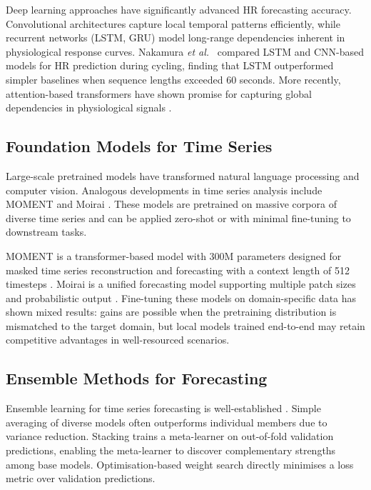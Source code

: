 \documentclass[11pt,a4paper]{article}
\newcommand{\etal}{\textit{et al.}}
\begin{document}
Deep learning approaches have significantly advanced HR forecasting accuracy.
Convolutional architectures capture local temporal patterns efficiently, while
recurrent networks (LSTM, GRU) model long-range dependencies inherent in
physiological response curves.  Nakamura \etal\ \cite{nakamura2020} compared
LSTM and CNN-based models for HR prediction during cycling, finding that LSTM
outperformed simpler baselines when sequence lengths exceeded 60 seconds.  More
recently, attention-based transformers have shown promise for capturing global
dependencies in physiological signals \cite{liu2024itransformer}.

\subsection{Foundation Models for Time Series}

Large-scale pretrained models have transformed natural language processing and
computer vision.  Analogous developments in time series analysis include
MOMENT \cite{goswami2024moment} and Moirai \cite{woo2024moirai}.  These
models are pretrained on massive corpora of diverse time series and can be
applied zero-shot or with minimal fine-tuning to downstream tasks.

MOMENT is a transformer-based model with 300M parameters designed for masked
time series reconstruction and forecasting with a context length of 512
timesteps \cite{goswami2024moment}.  Moirai is a unified forecasting model
supporting multiple patch sizes and probabilistic output \cite{woo2024moirai}.
Fine-tuning these models on domain-specific data has shown mixed results: gains
are possible when the pretraining distribution is mismatched to the target
domain, but local models trained end-to-end may retain competitive advantages
in well-resourced scenarios.

\subsection{Ensemble Methods for Forecasting}

Ensemble learning for time series forecasting is well-established
\cite{makridakis2018m4}.  Simple averaging of diverse models often outperforms
individual members due to variance reduction.  Stacking \cite{wolpert1992}
trains a meta-learner on out-of-fold validation predictions, enabling the
meta-learner to discover complementary strengths among base models.
Optimisation-based weight search directly minimises a loss metric over
validation predictions.
\end{document}
